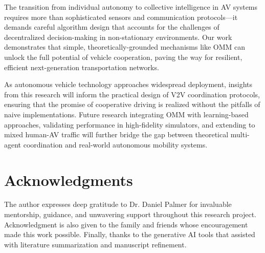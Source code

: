 \documentclass[conference]{IEEEtran}
\begin{document}
The transition from individual autonomy to collective intelligence in AV systems requires more than sophisticated sensors and communication protocols—it demands careful algorithm design that accounts for the challenges of decentralized decision-making in non-stationary environments. Our work demonstrates that simple, theoretically-grounded mechanisms like OMM can unlock the full potential of vehicle cooperation, paving the way for resilient, efficient next-generation transportation networks.

As autonomous vehicle technology approaches widespread deployment, insights from this research will inform the practical design of V2V coordination protocols, ensuring that the promise of cooperative driving is realized without the pitfalls of naive implementations. Future research integrating OMM with learning-based approaches, validating performance in high-fidelity simulators, and extending to mixed human-AV traffic will further bridge the gap between theoretical multi-agent coordination and real-world autonomous mobility systems.

\section*{Acknowledgments}

The author expresses deep gratitude to Dr. Daniel Palmer for invaluable mentorship, guidance, and unwavering support throughout this research project. Acknowledgment is also given to the family and friends whose encouragement made this work possible. Finally, thanks to the generative AI tools that assisted with literature summarization and manuscript refinement.
\end{document}
